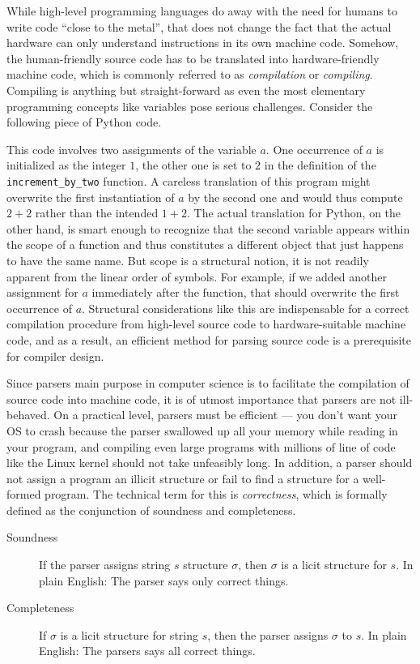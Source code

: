 While high-level programming languages do away with the need for humans to write code ``close to the metal'', that does not change the fact that the actual hardware can only understand instructions in its own machine code.
Somehow, the human-friendly source code has to be translated into hardware-friendly machine code, which is commonly referred to as \emph{compilation} or \emph{compiling}.
Compiling is anything but straight-forward as even the most elementary programming concepts like variables pose serious challenges.
Consider the following piece of Python code.
%
\begin{center}
\end{center}
%
This code involves two assignments of the variable $a$.
One occurrence of $a$ is initialized as the integer $1$, the other one is set to $2$ in the definition of the \verb|increment_by_two| function.
A careless translation of this program might overwrite the first instantiation of $a$ by the second one and would thus compute $2+2$ rather than the intended $1+2$.
The actual translation for Python, on the other hand, is smart enough to recognize that the second variable appears within the scope of a function and thus constitutes a different object that just happens to have the same name.
But scope is a structural notion, it is not readily apparent from the linear order of symbols.
For example, if we added another assignment for $a$ immediately after the function, that should overwrite the first occurrence of $a$. 
Structural considerations like this are indispensable for a correct compilation procedure from high-level source code to hardware-suitable machine code, and as a result, an efficient method for parsing source code is a prerequisite for compiler design.

Since parsers main purpose in computer science is to facilitate the compilation of source code into machine code, it is of utmost importance that parsers are not ill-behaved.
On a practical level, parsers must be efficient --- you don't want your OS to crash because the parser swallowed up all your memory while reading in your program, and compiling even large programs with millions of line of code like the Linux kernel should not take unfeasibly long.
In addition, a parser should not assign a program an illicit structure or fail to find a structure for a well-formed program.
The technical term for this is \emph{correctness}, which is formally defined as the conjunction of soundness and completeness.
%
\begin{description}
    \item[Soundness] If the parser assigns string $s$ structure $\sigma$, then $\sigma$ is a licit structure for $s$.
        In plain English: The parser says only correct things.
    \item[Completeness] If $\sigma$ is a licit structure for string $s$, then the parser assigns $\sigma$ to $s$.
        In plain English: The parsers says all correct things.
\end{description}

